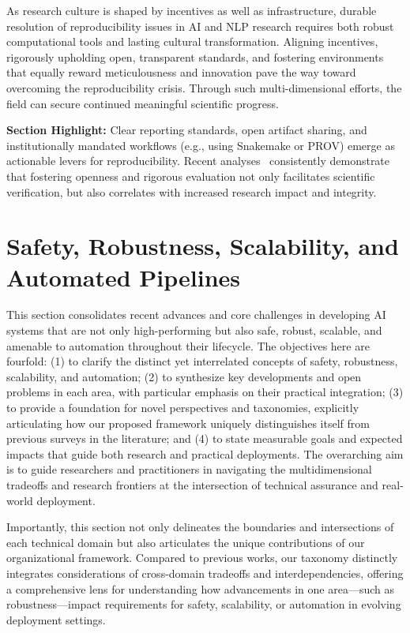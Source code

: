 \documentclass[sigconf]{acmart}
\begin{document}
As research culture is shaped by incentives as well as infrastructure, durable resolution of reproducibility issues in AI and NLP research requires both robust computational tools and lasting cultural transformation. Aligning incentives, rigorously upholding open, transparent standards, and fostering environments that equally reward meticulousness and innovation pave the way toward overcoming the reproducibility crisis. Through such multi-dimensional efforts, the field can secure continued meaningful scientific progress.

\smallskip
\textbf{Section Highlight:} Clear reporting standards, open artifact sharing, and institutionally mandated workflows (e.g., using Snakemake or PROV) emerge as actionable levers for reproducibility. Recent analyses~\cite{ref28,ref33,ref94,ref107,ref108} consistently demonstrate that fostering openness and rigorous evaluation not only facilitates scientific verification, but also correlates with increased research impact and integrity.

\section{Safety, Robustness, Scalability, and Automated Pipelines}

This section consolidates recent advances and core challenges in developing AI systems that are not only high-performing but also safe, robust, scalable, and amenable to automation throughout their lifecycle. The objectives here are fourfold: (1) to clarify the distinct yet interrelated concepts of safety, robustness, scalability, and automation; (2) to synthesize key developments and open problems in each area, with particular emphasis on their practical integration; (3) to provide a foundation for novel perspectives and taxonomies, explicitly articulating how our proposed framework uniquely distinguishes itself from previous surveys in the literature; and (4) to state measurable goals and expected impacts that guide both research and practical deployments. The overarching aim is to guide researchers and practitioners in navigating the multidimensional tradeoffs and research frontiers at the intersection of technical assurance and real-world deployment.

Importantly, this section not only delineates the boundaries and intersections of each technical domain but also articulates the unique contributions of our organizational framework. Compared to previous works, our taxonomy distinctly integrates considerations of cross-domain tradeoffs and interdependencies, offering a comprehensive lens for understanding how advancements in one area—such as robustness—impact requirements for safety, scalability, or automation in evolving deployment settings.
\end{document}
